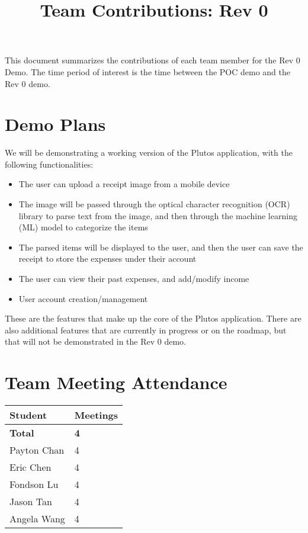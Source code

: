 \documentclass{article}
\title{Team Contributions: Rev 0\\\progname}
\author{\authname}
\date{}
\begin{document}
\maketitle

This document summarizes the contributions of each team member for the Rev 0
Demo.  The time period of interest is the time between the POC demo and the Rev
0 demo.

\section{Demo Plans}

We will be demonstrating a working version of the Plutos application, with the
following functionalities:
\begin{itemize}
    \item The user can upload a receipt image from a mobile device
    \item The image will be passed through the optical character recognition
    (OCR) library to parse text from the image, and then through the machine
    learning (ML) model to categorize the items
    \item The parsed items will be displayed to the user, and then the user can
    save the receipt to store the expenses under their account
    \item The user can view their past expenses, and add/modify income
    \item User account creation/management
\end{itemize}

\noindent These are the features that make up the core of the Plutos
application. There are also additional features that are currently in progress
or on the roadmap, but that will not be demonstrated in the Rev 0 demo.

\section{Team Meeting Attendance}


\begin{table}[H]
\centering
\begin{tabular}{ll}
\toprule
\textbf{Student} & \textbf{Meetings}\\
\midrule
\textbf{Total} & \textbf{4}\\
Payton Chan & 4\\
Eric Chen & 4\\
Fondson Lu & 4\\
Jason Tan & 4\\
Angela Wang & 4\\
\bottomrule
\end{tabular}
\end{table}
\end{document}
